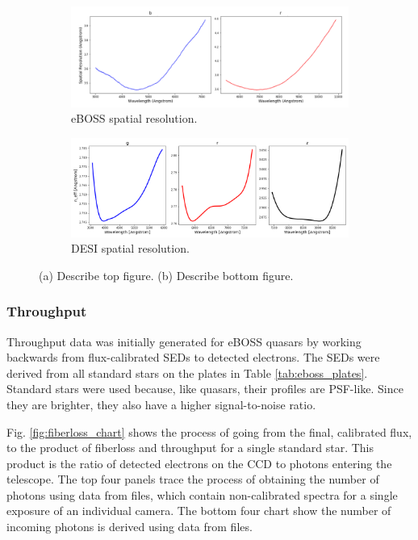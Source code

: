 \begin{figure}[h]
\centering
\begin{subfigure}[b]{0.55\textwidth}
   \includegraphics[width=14cm]{images/specsim/eboss_neff.png}
   \caption{eBOSS spatial resolution.}
   \label{fig:eboss_neff} 
\end{subfigure}

\begin{subfigure}[b]{0.55\textwidth}
   \includegraphics[width=14cm]{images/specsim/desi_neff.png}
   \caption{DESI spatial resolution.}
   \label{fig:desi_neff}
\end{subfigure}
\caption[Two numerical solutions]{(a) Describe top figure. (b) Describe bottom figure.}
\label{fig:neff}
\end{figure}


\subsubsection{Throughput}

Throughput data was initially generated for eBOSS quasars by working backwards from flux-calibrated SEDs to detected electrons. The SEDs were derived from all standard stars on the plates in Table \ref{tab:eboss_plates}. Standard stars were used because, like quasars, their profiles are PSF-like. Since they are brighter, they also have a higher signal-to-noise ratio. 

Fig. \ref{fig:fiberloss_chart} shows the process of going from the final, calibrated flux, to the product of fiberloss and throughput for a single standard star. This product is the ratio of detected electrons on the CCD to photons entering the telescope. The top four panels trace the process of obtaining the number of photons using data from  files, which contain non-calibrated spectra for a single exposure of an individual camera. The bottom four chart show the number of incoming photons is derived using data from  files.

